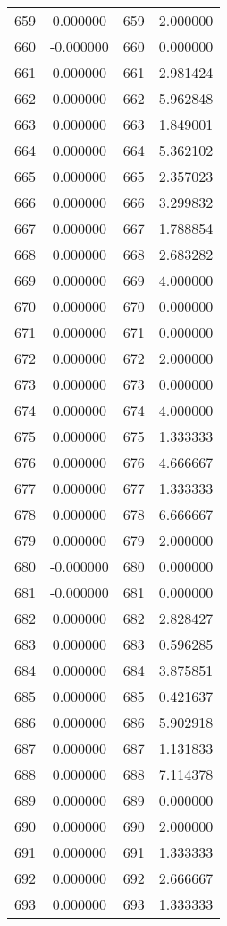 \documentclass[12pt]{article}
\begin{document}
\begin{longtable}{@{}cccc@{}}
659 & 0.000000 & 659 & 2.000000 \\
660 & -0.000000 & 660 & 0.000000 \\
661 & 0.000000 & 661 & 2.981424 \\
662 & 0.000000 & 662 & 5.962848 \\
663 & 0.000000 & 663 & 1.849001 \\
664 & 0.000000 & 664 & 5.362102 \\
665 & 0.000000 & 665 & 2.357023 \\
666 & 0.000000 & 666 & 3.299832 \\
667 & 0.000000 & 667 & 1.788854 \\
668 & 0.000000 & 668 & 2.683282 \\
669 & 0.000000 & 669 & 4.000000 \\
670 & 0.000000 & 670 & 0.000000 \\
671 & 0.000000 & 671 & 0.000000 \\
672 & 0.000000 & 672 & 2.000000 \\
673 & 0.000000 & 673 & 0.000000 \\
674 & 0.000000 & 674 & 4.000000 \\
675 & 0.000000 & 675 & 1.333333 \\
676 & 0.000000 & 676 & 4.666667 \\
677 & 0.000000 & 677 & 1.333333 \\
678 & 0.000000 & 678 & 6.666667 \\
679 & 0.000000 & 679 & 2.000000 \\
680 & -0.000000 & 680 & 0.000000 \\
681 & -0.000000 & 681 & 0.000000 \\
682 & 0.000000 & 682 & 2.828427 \\
683 & 0.000000 & 683 & 0.596285 \\
684 & 0.000000 & 684 & 3.875851 \\
685 & 0.000000 & 685 & 0.421637 \\
686 & 0.000000 & 686 & 5.902918 \\
687 & 0.000000 & 687 & 1.131833 \\
688 & 0.000000 & 688 & 7.114378 \\
689 & 0.000000 & 689 & 0.000000 \\
690 & 0.000000 & 690 & 2.000000 \\
691 & 0.000000 & 691 & 1.333333 \\
692 & 0.000000 & 692 & 2.666667 \\
693 & 0.000000 & 693 & 1.333333 \\

\end{longtable}
\end{document}
